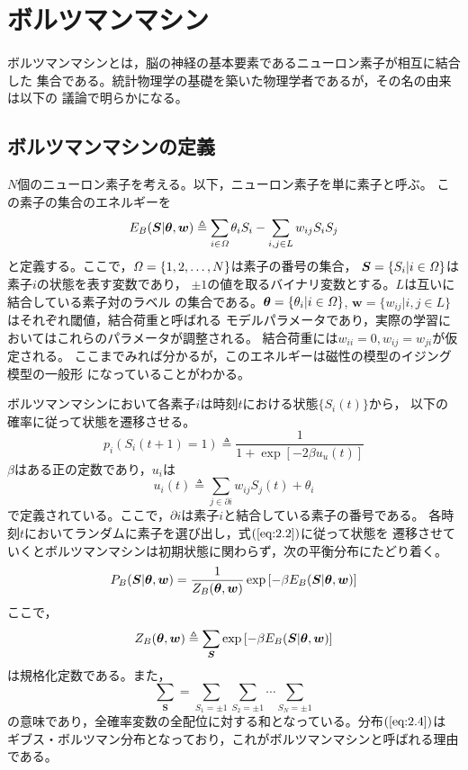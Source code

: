 \chapter{ボルツマンマシン}
ボルツマンマシンとは，脳の神経の基本要素であるニューロン素子が相互に結合した
集合である。統計物理学の基礎を築いた物理学者であるが，その名の由来は以下の
議論で明らかになる。

\section{ボルツマンマシンの定義}
$N$個のニューロン素子を考える。以下，ニューロン素子を単に素子と呼ぶ。
この素子の集合のエネルギーを
\begin{equation}
E_{B}(\bm{S}|\boldsymbol{\theta},\bm{w})\triangleq\sum_{i\in\mathit{\Omega}}\theta_{i}S_{i}
-\sum_{i,j\in L}w_{ij}S_{i}S_{j}\label{eq:2.1}
\end{equation}
と定義する。ここで，$\mathit{\Omega}=\{1,2,\ldots,N\}$は素子の番号の集合，
$\bm{S}=\{S_{i}|i\in\mathit{\Omega}\}$は素子$i$の状態を表す変数であり，
$\pm 1$の値を取るバイナリ変数とする。$L$は互いに結合している素子対のラベル
の集合である。$\boldsymbol{\theta}=\{\theta_{i}|i\in\mathit{\Omega}\}$,
$\bm{w}=\{w_{ij}|i,j\in L\}$はそれぞれ閾値，結合荷重と呼ばれる
モデルパラメータであり，実際の学習においてはこれらのパラメータが調整される。
結合荷重には$w_{ii}=0,w_{ij}=w_{ji}$が仮定される。
ここまでみれば分かるが，このエネルギーは磁性の模型のイジング模型の一般形
になっていることがわかる。

ボルツマンマシンにおいて各素子$i$は時刻$t$における状態$\{S_{i}(t)\}$から，
以下の確率に従って状態を遷移させる。
\begin{equation}
p_{i}(S_{i}(t+1)=1)\triangleq\frac{1}{1+\exp[-2\beta u_{u}(t)]}
\label{eq:2.2}
\end{equation}
$\beta$はある正の定数であり，$u_{i}$は
\begin{equation}
u_{i}(t)\triangleq\sum_{j\in\partial i}w_{ij}S_{j}(t)+\theta_{i}
\label{eq:2.3}
\end{equation}
で定義されている。ここで，$\partial i$は素子$i$と結合している素子の番号である。
各時刻$t$においてランダムに素子を選び出し，式$(\ref{eq:2.2})$に従って状態を
遷移させていくとボルツマンマシンは初期状態に関わらず，次の平衡分布にたどり着く。
\begin{equation}
P_{B}(\bm{S}|\boldsymbol{\theta},\bm{w})=\frac{1}{Z_{B}(\boldsymbol{\theta},\bm{w})}
\exp\left[-\beta E_{B}(\bm{S}|\boldsymbol{\theta},\bm{w})\right]
\label{eq:2.4}
\end{equation}
ここで，
\begin{equation}
Z_{B}(\boldsymbol{\theta},\bm{w})\triangleq\sum_{\bm{S}}\exp
\left[-\beta E_{B}(\bm{S}|\boldsymbol{\theta},\bm{w})\right]
\label{eq:2.5}
\end{equation}
は規格化定数である。また，
\begin{equation}
\sum_{\bm{S}}=\sum_{S_{1}=\pm 1}\sum_{S_{2}=\pm 1}\cdots\sum_{S_{N}=\pm 1}
\nonumber
\end{equation}
の意味であり，全確率変数の全配位に対する和となっている。分布$(\ref{eq:2.4})$は
ギブス・ボルツマン分布となっており，これがボルツマンマシンと呼ばれる理由である。


